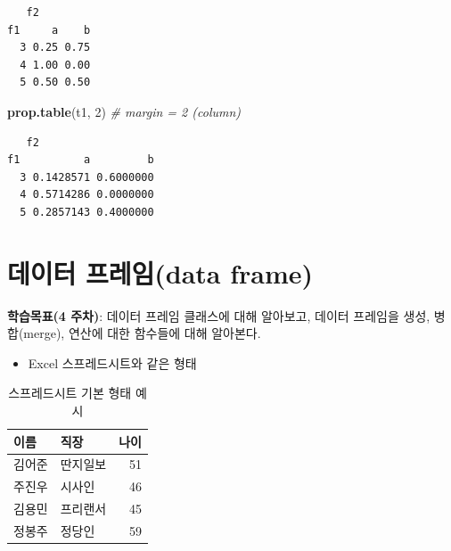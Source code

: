 \documentclass[
  11pt,
]{krantz}
\makeatletter
\newenvironment{Shaded}{\begin{snugshade}}{\end{snugshade}}
\newcommand{\CommentTok}[1]{\textcolor[rgb]{0.37,0.37,0.37}{\textit{#1}}}
\newcommand{\DecValTok}[1]{\textcolor[rgb]{0.06,0.06,0.06}{#1}}
\newcommand{\KeywordTok}[1]{\textcolor[rgb]{0.27,0.27,0.27}{\textbf{#1}}}
\newcommand{\NormalTok}[1]{#1}
\providecommand{\tightlist}{%
  \setlength{\itemsep}{0pt}\setlength{\parskip}{0pt}}
\newenvironment{kframe}{%
\medskip{}
\setlength{\fboxsep}{.8em}
 \def\at@end@of@kframe{}%
 \ifinner\ifhmode%
  \def\at@end@of@kframe{\end{minipage}}%
  \begin{minipage}{\columnwidth}%
 \fi\fi%
 \def\FrameCommand##1{\hskip\@totalleftmargin \hskip-\fboxsep
 \colorbox{shadecolor}{##1}\hskip-\fboxsep
     \hskip-\linewidth \hskip-\@totalleftmargin \hskip\columnwidth}%
 \MakeFramed {\advance\hsize-\width
   \@totalleftmargin\z@ \linewidth\hsize
   \@setminipage}}%
 {\par\unskip\endMakeFramed%
 \at@end@of@kframe}
\newenvironment{rmdblock}[1]
  {
  \begin{itemize}
  \renewcommand{\labelitemi}{
    \raisebox{-.7\height}[0pt][0pt]{
      {\setkeys{Gin}{width=3em,keepaspectratio}\texttt{[image: images/\#1]}}
    }
  }
  \setlength{\fboxsep}{1em}
  \begin{kframe}
  \item
  }
  {
  \end{kframe}
  \end{itemize}
  }
\newenvironment{rmdnote}
  {\begin{rmdblock}{note}}
  {\end{rmdblock}}
\makeatother
\begin{document}
\begin{verbatim}
   f2
f1     a    b
  3 0.25 0.75
  4 1.00 0.00
  5 0.50 0.50
\end{verbatim}

\begin{Shaded}
\begin{Highlighting}[]
\KeywordTok{prop.table}\NormalTok{(t1, }\DecValTok{2}\NormalTok{) }\CommentTok{# margin = 2 (column)}
\end{Highlighting}
\end{Shaded}

\begin{verbatim}
   f2
f1          a         b
  3 0.1428571 0.6000000
  4 0.5714286 0.0000000
  5 0.2857143 0.4000000
\end{verbatim}

\normalsize

\hypertarget{data-frame}{%
\section{데이터 프레임(data frame)}\label{data-frame}}

\footnotesize

\begin{rmdnote}
\begin{rmdnote}

\textbf{학습목표(4 주차)}: 데이터 프레임 클래스에 대해 알아보고, 데이터 프레임을 생성, 병합(merge), 연산에 대한 함수들에 대해 알아본다.

\end{rmdnote}
\end{rmdnote}

\normalsize

\begin{itemize}
\tightlist
\item
  Excel 스프레드시트와 같은 형태
\end{itemize}

\footnotesize

\begin{table}

\caption{\label{tab:unnamed-chunk-53}스프레드시트 기본 형태 예시}
\centering
\begin{tabular}[t]{l|l|r}
\hline
이름 & 직장 & 나이\\
\hline
김어준 & 딴지일보 & 51\\
\hline
주진우 & 시사인 & 46\\
\hline
김용민 & 프리랜서 & 45\\
\hline
정봉주 & 정당인 & 59\\
\hline
\end{tabular}
\end{table}
\end{document}
